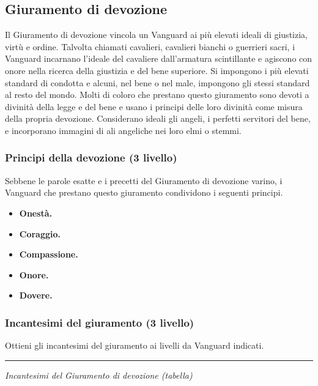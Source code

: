 \documentclass[a4paper,10pt,twoside,twocolumn,openany,bg=full,nodeprecatedcode]{dndbook}
\begin{document}
\subsection{Giuramento di devozione}\label{giuramento_di_devozione}
Il Giuramento di devozione vincola un Vanguard ai più elevati ideali di giustizia, virtù e ordine. Talvolta chiamati cavalieri, cavalieri bianchi o guerrieri sacri, i Vanguard incarnano l'ideale del cavaliere dall'armatura scintillante e agiscono con onore nella ricerca della giustizia e del bene superiore. Si impongono i più elevati standard di condotta e alcuni, nel bene o nel male, impongono gli stessi standard al resto del mondo. Molti di coloro che prestano questo giuramento sono devoti a divinità della legge e del bene e usano i principi delle loro divinità come misura della propria devozione. Considerano ideali gli angeli, i perfetti servitori del bene, e incorporano immagini di ali angeliche nei loro elmi o stemmi.

\subsubsection{Principi della devozione (3\degree{} livello)}\label{principi_della_devozione_3_livello}
Sebbene le parole esatte e i precetti del Giuramento di devozione varino, i Vanguard che prestano questo giuramento condividono i seguenti principi.

\begin{itemize}
  \item \textbf{Onestà.}
  \item \textbf{Coraggio.}
  \item \textbf{Compassione.}
  \item \textbf{Onore.}
  \item \textbf{Dovere.}
\end{itemize}

\subsubsection{Incantesimi del giuramento (3\degree{} livello)}\label{incantesimi_del_giuramento_3_livello}
Ottieni gli incantesimi del giuramento ai livelli da Vanguard indicati.

\par\medskip\noindent\rule{\linewidth}{0.4pt}\medskip

\emph{Incantesimi del Giuramento di devozione (tabella)}
\end{document}
